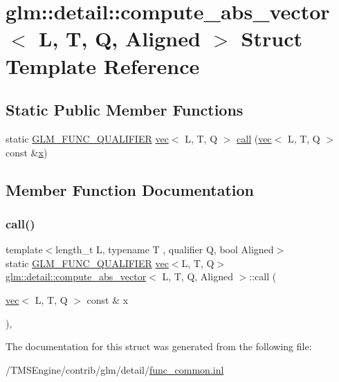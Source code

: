 \hypertarget{structglm_1_1detail_1_1compute__abs__vector}{}\section{glm\+:\+:detail\+:\+:compute\+\_\+abs\+\_\+vector$<$ L, T, Q, Aligned $>$ Struct Template Reference}
\label{structglm_1_1detail_1_1compute__abs__vector}
\subsection*{Static Public Member Functions}
\begin{DoxyCompactItemize}
\item 
static \hyperlink{setup_8hpp_a33fdea6f91c5f834105f7415e2a64407}{G\+L\+M\+\_\+\+F\+U\+N\+C\+\_\+\+Q\+U\+A\+L\+I\+F\+I\+ER} \hyperlink{structglm_1_1vec}{vec}$<$ L, T, Q $>$ \hyperlink{structglm_1_1detail_1_1compute__abs__vector_a888d9125f1091c659f0135bafdbe6c19}{call} (\hyperlink{structglm_1_1vec}{vec}$<$ L, T, Q $>$ const \&\hyperlink{_s_d_l__opengl_8h_ad0e63d0edcdbd3d79554076bf309fd47}{x})
\end{DoxyCompactItemize}


\subsection{Member Function Documentation}
\mbox{\label{structglm_1_1detail_1_1compute__abs__vector_a888d9125f1091c659f0135bafdbe6c19}} 
\subsubsection{\texorpdfstring{call()}{call()}}
{\footnotesize\ttfamily template$<$length\+\_\+t L, typename T , qualifier Q, bool Aligned$>$ \\
static \hyperlink{setup_8hpp_a33fdea6f91c5f834105f7415e2a64407}{G\+L\+M\+\_\+\+F\+U\+N\+C\+\_\+\+Q\+U\+A\+L\+I\+F\+I\+ER} \hyperlink{structglm_1_1vec}{vec}$<$L, T, Q$>$ \hyperlink{structglm_1_1detail_1_1compute__abs__vector}{glm\+::detail\+::compute\+\_\+abs\+\_\+vector}$<$ L, T, Q, Aligned $>$\+::call (\begin{DoxyParamCaption}\item[{\hyperlink{structglm_1_1vec}{vec}$<$ L, T, Q $>$ const \&}]{x }\end{DoxyParamCaption})\hspace{0.3cm}{\ttfamily [inline]}, {\ttfamily [static]}}



The documentation for this struct was generated from the following file\+:\begin{DoxyCompactItemize}
\item 
/\+T\+M\+S\+Engine/contrib/glm/detail/\hyperlink{func__common_8inl}{func\+\_\+common.\+inl}\end{DoxyCompactItemize}
